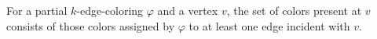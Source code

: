 \begin{definition}
For a partial $k$-edge-coloring $\varphi$ and a vertex $v$, the set of
colors present at $v$ consists of those colors assigned by $\varphi$ to at
least one edge incident with $v$.
\end{definition}
